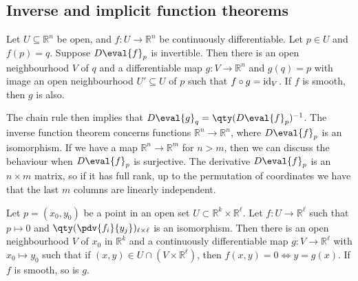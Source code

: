 \subsection{Inverse and implicit function theorems}
\begin{theorem}
	Let $U \subseteq \mathbb R^n$ be open, and $f \colon U \to \mathbb R^n$ be continuously differentiable.
	Let $p \in U$ and $f(p) = q$.
	Suppose $D\eval{f}_p$ is invertible.
	Then there is an open neighbourhood $V$ of $q$ and a differentiable map $g \colon V \to \mathbb R^n$ and $g(q) = p$ with image an open neighbourhood $U' \subseteq U$ of $p$ such that $f \circ g = \operatorname{id}_V$.
	If $f$ is smooth, then $g$ is also.
\end{theorem}
\begin{remark}
	The chain rule then implies that $D\eval{g}_q = \qty(D\eval{f}_p)^{-1}$.
	The inverse function theorem concerns functions $\mathbb R^n \to \mathbb R^n$, where $D\eval{f}_p$ is an isomorphism.
	If we have a map $\mathbb R^n \to \mathbb R^m$ for $n > m$, then we can discuss the behaviour when $D\eval{f}_p$ is surjective.
	The derivative $D\eval{f}_p$ is an $n \times m$ matrix, so if it has full rank, up to the permutation of coordinates we have that the last $m$ columns are linearly independent.
\end{remark}
\begin{theorem}
	Let $p = (x_0, y_0)$ be a point in an open set $U \subset \mathbb R^k \times \mathbb R^\ell$.
	Let $f \colon U \to \mathbb R^\ell$ such that $p \mapsto 0$ and $\qty(\pdv{f_i}{y_j})_{\ell \times \ell}$ is an isomorphism.
	Then there is an open neighbourhood $V$ of $x_0$ in $\mathbb R^k$ and a continuously differentiable map $g \colon V \to \mathbb R^\ell$ with $x_0 \mapsto y_0$ such that if $(x,y) \in U \cap (V \times \mathbb R^\ell)$, then $f(x,y)=0\iff y=g(x)$.
	If $f$ is smooth, so is $g$.
\end{theorem}
